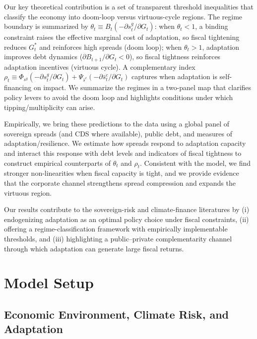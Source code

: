 \documentclass[12pt]{article}
\begin{document}
Our key theoretical contribution is a set of transparent threshold inequalities that classify the economy into
doom-loop versus virtuous-cycle regions. The regime boundary is summarized by
$\theta_t \equiv B_t\!\left(-\partial s_t^g/\partial G_t\right)$: when $\theta_t<1$, a binding constraint raises the
effective marginal cost of adaptation, so fiscal tightening reduces $G_t^*$ and reinforces high spreads (doom loop);
when $\theta_t>1$, adaptation improves debt dynamics ($\partial B_{t+1}/\partial G_t<0$), so fiscal tightness
reinforces adaptation incentives (virtuous cycle). A complementary index
$\rho_t \equiv \Phi_{s^g}(-\partial s_t^g/\partial G_t)+\Psi_{\bar s^c}(-\partial \bar s_t^c/\partial G_t)$ captures
when adaptation is self-financing on impact. We summarize the regimes in a two-panel map that clarifies policy levers
to avoid the doom loop and highlights conditions under which tipping/multiplicity can arise.

Empirically, we bring these predictions to the data using a global panel of sovereign spreads (and CDS where available),
public debt, and measures of adaptation/resilience. We estimate how spreads respond to adaptation capacity and interact
this response with debt levels and indicators of fiscal tightness to construct empirical counterparts of $\theta_t$ and
$\rho_t$. Consistent with the model, we find stronger non-linearities when fiscal capacity is tight, and we provide
evidence that the corporate channel strengthens spread compression and expands the virtuous region.

Our results contribute to the sovereign-risk and climate-finance literatures by (i) endogenizing adaptation as an
optimal policy choice under fiscal constraints, (ii) offering a regime-classification framework with empirically
implementable thresholds, and (iii) highlighting a public--private complementarity channel through which adaptation can
generate large fiscal returns.



\section{Model Setup}
\label{sec:model_setup_B}

\subsection{Economic Environment, Climate Risk, and Adaptation}
 
\end{document}

